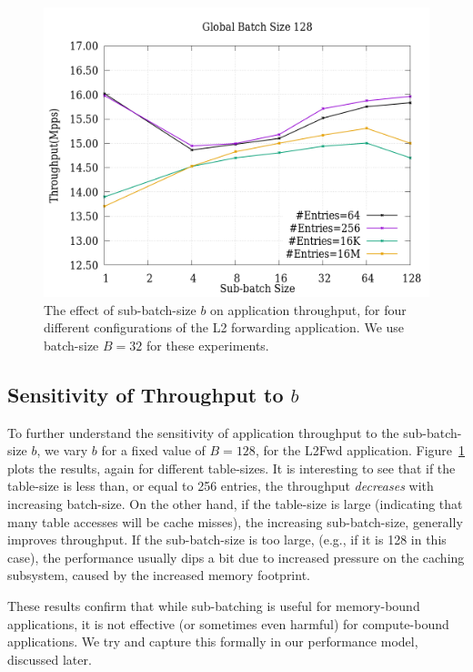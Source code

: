 \begin{figure}[ht]
\includegraphics[width = \linewidth]{Figures/Subbatching.png}
\caption{The effect of sub-batch-size $b$ on application throughput, for four different configurations of the L2 forwarding application. We use batch-size $B=32$ for these experiments.}
\label{fig:subbatchfigure}
\end{figure}

\subsection{Sensitivity of Throughput to $b$}

To further understand the sensitivity of application throughput to the sub-batch-size $b$, we vary
$b$ for a fixed value of $B=128$, for the L2Fwd application. Figure~\ref{fig:subbatchfigure} plots
the results, again for different table-sizes. It is interesting to see
that if the table-size is less than, or equal to 256 entries, the throughput
{\em decreases} with increasing batch-size. On the other hand, if the table-size
is large (indicating that many table accesses will be cache misses), the
increasing sub-batch-size, generally improves throughput. If the sub-batch-size
is too large, (e.g., if it is 128 in this case), the performance usually dips
a bit due to increased pressure on the caching subsystem, caused by the
increased memory footprint.

These results confirm that while sub-batching is useful for memory-bound
applications, it is not effective (or sometimes even harmful) for
compute-bound applications. We try and capture this formally in our
performance model, discussed later.

